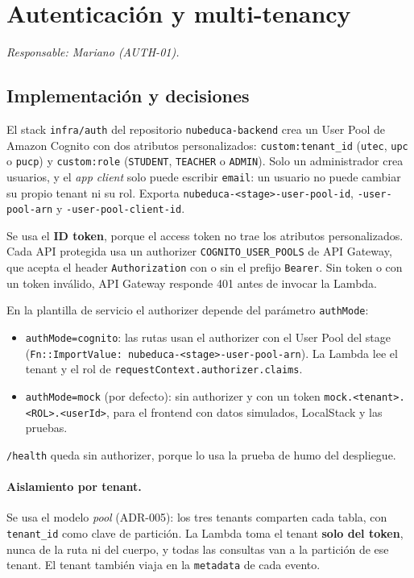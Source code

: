 \section{Autenticación y multi-tenancy}
\label{sec:seguridad}
\textit{Responsable: Mariano (AUTH-01).}

\subsection{Implementación y decisiones}
El stack \texttt{infra/auth} del repositorio \texttt{nubeduca-backend} crea un User Pool de Amazon
Cognito con dos atributos personalizados: \texttt{custom:tenant\_id} (\texttt{utec}, \texttt{upc} o
\texttt{pucp}) y \texttt{custom:role} (\texttt{STUDENT}, \texttt{TEACHER} o \texttt{ADMIN}). Solo un
administrador crea usuarios, y el \textit{app client} solo puede escribir \texttt{email}: un usuario no
puede cambiar su propio tenant ni su rol. Exporta \texttt{nubeduca-<stage>-user-pool-id},
\texttt{-user-pool-arn} y \texttt{-user-pool-client-id}.

Se usa el \textbf{ID token}, porque el access token no trae los atributos personalizados. Cada API
protegida usa un authorizer \texttt{COGNITO\_USER\_POOLS} de API Gateway, que acepta el header
\texttt{Authorization} con o sin el prefijo \texttt{Bearer}. Sin token o con un token inválido,
API Gateway responde 401 antes de invocar la Lambda.

En la plantilla de servicio el authorizer depende del parámetro \texttt{authMode}:
\begin{itemize}
  \item \texttt{authMode=cognito}: las rutas usan el authorizer con el User Pool del stage
        (\texttt{Fn::ImportValue: nubeduca-<stage>-user-pool-arn}). La Lambda lee el tenant y el rol de
        \texttt{requestContext.authorizer.claims}.
  \item \texttt{authMode=mock} (por defecto): sin authorizer y con un token
        \texttt{mock.<tenant>.<ROL>.<userId>}, para el frontend con datos simulados, LocalStack y las
        pruebas.
\end{itemize}
\texttt{/health} queda sin authorizer, porque lo usa la prueba de humo del despliegue.

\paragraph{Aislamiento por tenant.}
Se usa el modelo \textit{pool} (ADR-005): los tres tenants comparten cada tabla, con
\texttt{tenant\_id} como clave de partición. La Lambda toma el tenant \textbf{solo del token}, nunca de
la ruta ni del cuerpo, y todas las consultas van a la partición de ese tenant. El tenant también viaja
en la \texttt{metadata} de cada evento.

